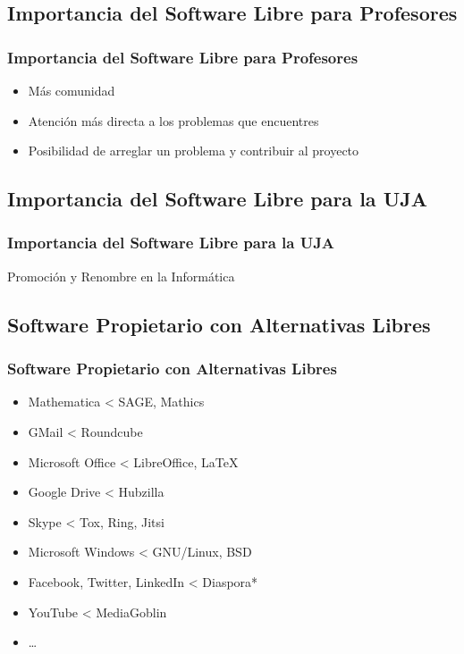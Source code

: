 \documentclass[xetex]{beamer}
\begin{document}

\subsection{Importancia del Software Libre para Profesores}
\begin{frame}[t]
    \frametitle{Importancia del Software Libre para Profesores}
    \pause{}
    \begin{itemize}[<+->]
        \item Más comunidad
        \item Atención más directa a los problemas que encuentres
        \item Posibilidad de arreglar un problema y contribuir al proyecto
    \end{itemize}
\end{frame}


\subsection{Importancia del Software Libre para la UJA}
\begin{frame}
    \frametitle{Importancia del Software Libre para la UJA}
    \pause{}
    \centering \Large Promoción y Renombre en la Informática
\end{frame}


\subsection{Software Propietario con Alternativas Libres}
\begin{frame}
    \frametitle{Software Propietario con Alternativas Libres}
    \pause{}
    \begin{itemize}[<+->]
        \item Mathematica < SAGE, Mathics
        \item GMail < Roundcube
        \item Microsoft Office < LibreOffice, \LaTeX{}
        \item Google Drive < Hubzilla
        \item Skype < Tox, Ring, Jitsi
        \item Microsoft Windows < GNU/Linux, BSD
        \item Facebook, Twitter, LinkedIn < Diaspora*
        \item YouTube < MediaGoblin
        \item \ldots
    \end{itemize}
\end{frame}
\end{document}

